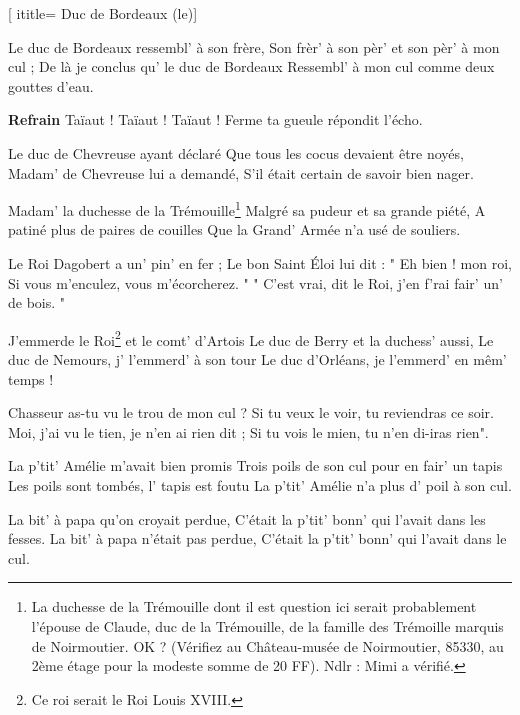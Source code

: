  [
ititle= {Duc de Bordeaux (le)}]


\beginverse
Le duc de Bordeaux ressembl' à son frère,
Son frèr' à son pèr' et son pèr' à mon cul ;
De là je conclus qu' le duc de Bordeaux
Ressembl' à mon cul comme deux gouttes d'eau.
\endverse

\beginchorus
\textbf {Refrain}
Taïaut ! Taïaut ! Taïaut !
Ferme ta gueule répondit l'écho.
\endchorus

\beginverse
Le duc de Chevreuse ayant déclaré
Que tous les cocus devaient être noyés,
Madam' de Chevreuse lui a demandé,
S'il était certain de savoir bien nager.
\endverse

\beginverse
Madam' la duchesse de la Trémouille\footnote {La duchesse de la Trémouille dont il est question ici serait probablement l'épouse de Claude, duc de la Trémouille, de la famille des Trémoille marquis de Noirmoutier. OK ? (Vérifiez au Château-musée de Noirmoutier, 85330, au 2ème étage pour la modeste somme de 20 FF). Ndlr : Mimi a vérifié.}
Malgré sa pudeur et sa grande piété,
A patiné plus de paires de couilles
Que la Grand' Armée n'a usé de souliers.
\endverse

\beginverse
Le Roi Dagobert a un' pin' en fer ;
Le bon Saint Éloi lui dit : " Eh bien ! mon roi,
Si vous m'enculez, vous m'écorcherez. "
" C'est vrai, dit le Roi, j'en f'rai fair' un' de bois. "
\endverse

\beginverse
J'emmerde le Roi\footnote {Ce roi serait le Roi Louis XVIII.} et le comt' d'Artois
Le duc de Berry et la duchess' aussi,
Le duc de Nemours, j' l'emmerd' à son tour
Le duc d'Orléans, je l'emmerd' en mêm' temps !
\endverse

\beginverse
Chasseur as-tu vu le trou de mon cul ?
Si tu veux le voir, tu reviendras ce soir.
Moi, j'ai vu le tien, je n'en ai rien dit ;
Si tu vois le mien, tu n'en di-iras rien".
\endverse

\beginverse
La p'tit' Amélie m'avait bien promis
Trois poils de son cul pour en fair' un tapis
Les poils sont tombés, l' tapis est foutu
La p'tit' Amélie n'a plus d' poil à son cul.
\endverse

\beginverse
La bit' à papa qu'on croyait perdue,
C'était la p'tit' bonn' qui l'avait dans les fesses.
La bit' à papa n'était pas perdue,
C'était la p'tit' bonn' qui l'avait dans le cul.
\endverse

\endsong
